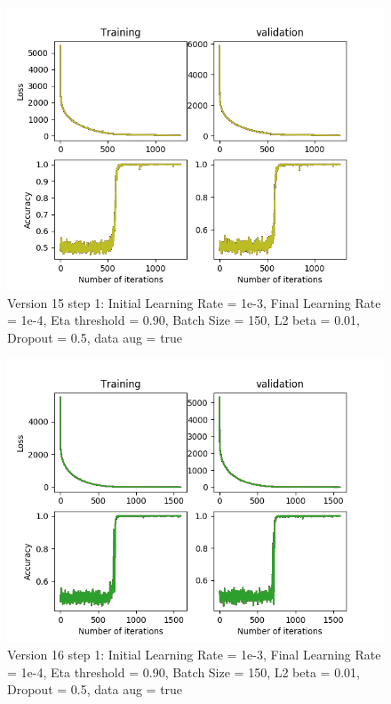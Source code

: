 \documentclass[12pt,reqno]{amsart}
\numberwithin{equation}{section}
\begin{document}
\begin{enumerate}
\begin{figure}[H]
\centering
\includegraphics[scale=0.6]{data_liquid10_version15_step1}
\caption{Version 15 step 1: Initial Learning Rate = 1e-3, Final Learning Rate = 1e-4, Eta threshold = 0.90, Batch Size = 150, L2 beta = 0.01, Dropout = 0.5, data aug = true}
\end{figure}

\begin{figure}[H]
\centering
\includegraphics[scale=0.6]{data_liquid10_version16_step1}
\caption{Version 16 step 1: Initial Learning Rate = 1e-3, Final Learning Rate = 1e-4, Eta threshold = 0.90, Batch Size = 150, L2 beta = 0.01, Dropout = 0.5, data aug = true}
\end{figure}


\end{enumerate}
\end{document}
